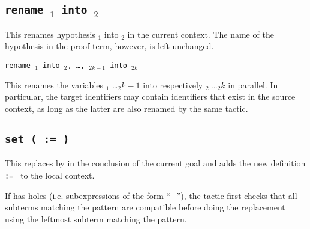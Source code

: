 \begin{coq_example*}
\begin{ErrMsgs}
\end{ErrMsgs}

\subsection{\tt rename {\ident$_1$} into {\ident$_2$}}

This renames hypothesis {\ident$_1$} into {\ident$_2$} in the current
context. The name of the hypothesis in the proof-term, however, is left
unchanged.

\begin{Variants}

\item {\tt rename {\ident$_1$} into {\ident$_2$}, \ldots,
    {\ident$_{2k-1}$} into {\ident$_{2k}$}}

This renames the variables {\ident$_1$} \ldots {\ident$_2k-1$} into respectively
{\ident$_2$} \ldots {\ident$_2k$} in parallel. In particular, the target
identifiers may contain identifiers that exist in the source context, as long
as the latter are also renamed by the same tactic.

\end{Variants}

\begin{ErrMsgs}
\item {}
\item {}
\end{ErrMsgs}

\subsection{\tt set ( {\ident} := {\term} )}
\label{tactic:set}

This replaces {\term} by {\ident} in the conclusion of the current goal
and adds the new definition {\tt {\ident} := \term} to the local context.

If {\term} has holes (i.e. subexpressions of the form ``\_''), the
tactic first checks that all subterms matching the pattern are
compatible before doing the replacement using the leftmost subterm
matching the pattern.

\begin{ErrMsgs}
\item {}
\end{ErrMsgs}

\begin{Variants}


\end{Variants}
\end{coq_example*}
